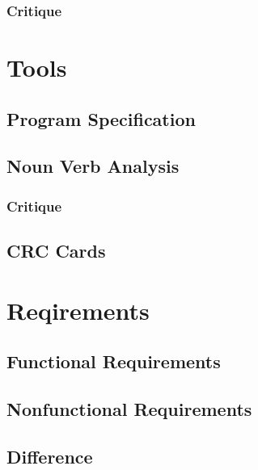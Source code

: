 \subsubsection{Critique}

\section{Tools}
\subsection{Program Specification}
\subsection{Noun Verb Analysis}
\subsubsection{Critique}


\subsection{CRC Cards}


\section{Reqirements}

\subsection{Functional Requirements}

\subsection{Nonfunctional Requirements}

\begin{inspiration}{\cite{love_guadec2005}}
\end{inspiration}

\subsection{Difference}

